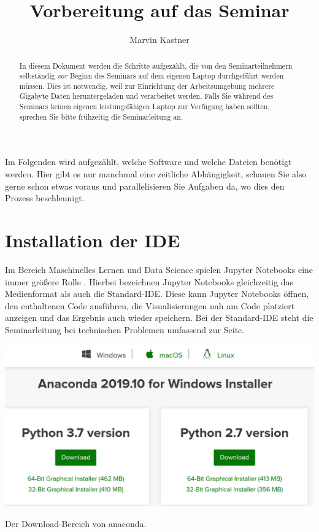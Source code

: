 \documentclass{tufte-handout}
\title{Vorbereitung auf das Seminar}
\author{Marvin Kastner}
\begin{document}
\maketitle%

\begin{abstract}
\noindent
In diesem Dokument werden die Schritte aufgezählt, die von den Seminarteilnehmern selbständig \emph{vor} Beginn des Seminars auf dem eigenen Laptop durchgeführt werden müssen.
Dies ist notwendig, weil zur Einrichtung der Arbeitsumgebung mehrere Gigabyte Daten heruntergeladen und verarbeitet werden.
Falls Sie während des Seminars keinen eigenen leistungsfähigen Laptop zur Verfügung haben sollten, sprechen Sie bitte frühzeitig die Seminarleitung an.
\end{abstract}

Im Folgenden wird aufgezählt, welche Software und welche Dateien benötigt werden.
Hier gibt es nur manchmal eine zeitliche Abhängigkeit, schauen Sie also gerne schon etwas voraus und parallelisieren Sie Aufgaben da, wo dies den Prozess beschleunigt.


\section{Installation der IDE}

Im Bereich Maschinelles Lernen und Data Science spielen Jupyter Notebooks eine immer größere Rolle%
\cite{perkel_why_2018,hiltch_jupyter_2019}.
Hierbei bezeichnen Jupyter Notebooks gleichzeitig das Medienformat als auch die Standard-IDE.
Diese kann Jupyter Notebooks öffnen, den enthaltenen Code ausführen, die Visualisierungen nah am Code platziert anzeigen und das Ergebnis auch wieder speichern.
Bei der Standard-IDE steht die Seminarleitung bei technischen Problemen umfassend zur Seite.

\begin{marginfigure}
  \includegraphics{anaconda}
  \caption{Der Download-Bereich von anaconda.}%
\label{fig:anaconda}
\end{marginfigure}
\end{document}
